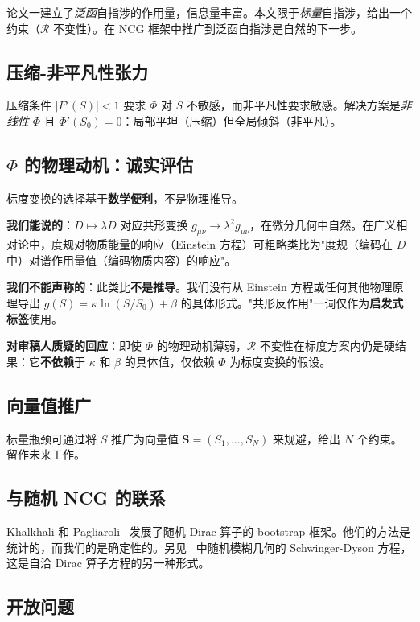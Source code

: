 \documentclass[11pt,a4paper]{ctexart}
\theoremstyle{remark}
\newcommand{\R}{\mathcal{R}}
\begin{document}
论文一建立了\emph{泛函}自指涉的作用量，信息量丰富。本文限于\emph{标量}自指涉，给出一个约束（$\R$ 不变性）。在 NCG 框架中推广到泛函自指涉是自然的下一步。

\subsection{压缩-非平凡性张力}

压缩条件 $|F'(S)| < 1$ 要求 $\Phi$ 对 $S$ 不敏感，而非平凡性要求敏感。解决方案是\emph{非线性} $\Phi$ 且 $\Phi'(S_0) = 0$：局部平坦（压缩）但全局倾斜（非平凡）。

\subsection{$\Phi$ 的物理动机：诚实评估}

标度变换的选择基于\textbf{数学便利}，不是物理推导。

\textbf{我们能说的}：$D \mapsto \lambda D$ 对应共形变换 $g_{\mu\nu} \to \lambda^2 g_{\mu\nu}$，在微分几何中自然。在广义相对论中，度规对物质能量的响应（Einstein 方程）可粗略类比为"度规（编码在 $D$ 中）对谱作用量值（编码物质内容）的响应"。

\textbf{我们不能声称的}：此类比\textbf{不是推导}。我们没有从 Einstein 方程或任何其他物理原理导出 $g(S) = \kappa\ln(S/S_0) + \beta$ 的具体形式。"共形反作用"一词仅作为\textbf{启发式标签}使用。

\textbf{对审稿人质疑的回应}：即使 $\Phi$ 的物理动机薄弱，$\R$ 不变性在标度方案内仍是硬结果：它\textbf{不依赖}于 $\kappa$ 和 $\beta$ 的具体值，仅依赖 $\Phi$ 为标度变换的假设。

\subsection{向量值推广}

标量瓶颈可通过将 $S$ 推广为向量值 $\mathbf{S} = (S_1, \ldots, S_N)$ 来规避，给出 $N$ 个约束。留作未来工作。

\subsection{与随机 NCG 的联系}

Khalkhali 和 Pagliaroli~\cite{Kha25} 发展了随机 Dirac 算子的 bootstrap 框架。他们的方法是统计的，而我们的是确定性的。另见~\cite{GKP26} 中随机模糊几何的 Schwinger-Dyson 方程，这是自洽 Dirac 算子方程的另一种形式。

\subsection{开放问题}
\end{document}
